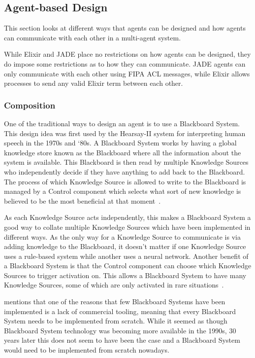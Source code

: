 \subsection{Agent-based Design}

This section looks at different ways that agents can be designed and how agents can communicate with each other in a multi-agent system.

While Elixir and JADE place no restrictions on how agents can be designed, they do impose some restrictions as to how they can communicate.
JADE agents can only communicate with each other using FIPA ACL messages, while Elixir allows processes to send any valid Elixir term between each other.

\subsubsection{Composition}

One of the traditional ways to design an agent is to use a Blackboard System.
This design idea was first used by the Hearsay-II system for interpreting human speech in the 1970s and `80s.
A Blackboard System works by having a global knowledge store known as the Blackboard where all the information about the system is available.
This Blackboard is then read by multiple Knowledge Sources who independently decide if they have anything to add back to the Blackboard.
The process of which Knowledge Source is allowed to write to the Blackboard is managed by a Control component which selects what sort of new knowledge is believed to be the most beneficial at that moment~\cite{nii1986blackboard}.

As each Knowledge Source acts independently, this makes a Blackboard System a good way to collate multiple Knowledge Sources which have been implemented in different ways.
As the only way for a Knowledge Source to communicate is via adding knowledge to the Blackboard, it doesn't matter if one Knowledge Source uses a rule-based system while another uses a neural network.
Another benefit of a Blackboard System is that the Control component can choose which Knowledge Sources to trigger activation on.
This allows a Blackboard System to have many Knowledge Sources, some of which are only activated in rare situations~\cite{corkill1991blackboard}.

 mentions that one of the reasons that few Blackboard Systems have been implemented is a lack of commercial tooling, meaning that every Blackboard System needs to be implemented from scratch.
While it seemed as though Blackboard System technology was becoming more available in the 1990s, 30 years later this does not seem to have been the case and a Blackboard System would need to be implemented from scratch nowadays.

